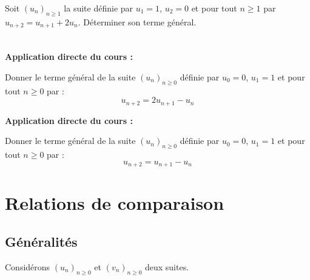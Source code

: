 \documentclass[french,11pt,twoside]{VcCours}
\newenvironment{ApplicationDirecte}{\textbf{Application directe du cours :}

}{}
\begin{document}
\begin{Exemple} Soit $(u_n)_{n \geq 1}$ la suite définie par $u_1 = 1$, $u_2 = 0$ et pour tout $n \geq 1$ par $u_{n+2}= u_{n+1} + 2 u_n$. Déterminer son terme général.

%
%
%
%
%

\vspace{11cm}
\end{Exemple}

\newpage

$\phantom{test}$

\vspace{4cm}

\begin{ApplicationDirecte} Donner le terme général de la suite $(u_n)_{n \geq 0}$ définie par $u_0=0$, $u_1=1$ et pour tout $n \geq 0$ par :  $$u_{n+2} = 2 u_{n+1}-u_n$$
\end{ApplicationDirecte}

\begin{ApplicationDirecte} Donner le terme général de la suite $(u_n)_{n \geq 0}$ définie par $u_0=0$, $u_1=1$ et pour tout $n \geq 0$ par : $$ u_{n+2} =  u_{n+1} - u_n$$ \end{ApplicationDirecte}


\section{Relations de comparaison}
\subsection{Généralités}
Considérons $(u_n)_{n \geq 0}$ et $(v_n)_{n \geq 0}$ deux suites.
\end{document}
